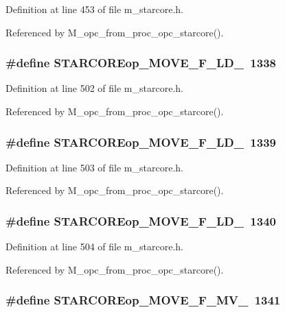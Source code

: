 Definition at line 453 of file m\_\-starcore.h.

Referenced by M\_\-opc\_\-from\_\-proc\_\-opc\_\-starcore().
\subsubsection{\setlength{\rightskip}{0pt plus 5cm}\#define STARCOREop\_\-MOVE\_\-F\_\-LD\_~1338}\label{m__starcore_8h_da1e893b6698056073610f6af0310e6f}




Definition at line 502 of file m\_\-starcore.h.

Referenced by M\_\-opc\_\-from\_\-proc\_\-opc\_\-starcore().
\subsubsection{\setlength{\rightskip}{0pt plus 5cm}\#define STARCOREop\_\-MOVE\_\-F\_\-LD\_~1339}\label{m__starcore_8h_83001b201e0c102d50585dfed801fe95}




Definition at line 503 of file m\_\-starcore.h.

Referenced by M\_\-opc\_\-from\_\-proc\_\-opc\_\-starcore().
\subsubsection{\setlength{\rightskip}{0pt plus 5cm}\#define STARCOREop\_\-MOVE\_\-F\_\-LD\_~1340}\label{m__starcore_8h_3152ec54d071574fed534e659f85a0b1}




Definition at line 504 of file m\_\-starcore.h.

Referenced by M\_\-opc\_\-from\_\-proc\_\-opc\_\-starcore().
\subsubsection{\setlength{\rightskip}{0pt plus 5cm}\#define STARCOREop\_\-MOVE\_\-F\_\-MV\_~1341}\label{m__starcore_8h_7d2e19b6e0156d01cd3f378038a74d6d}




